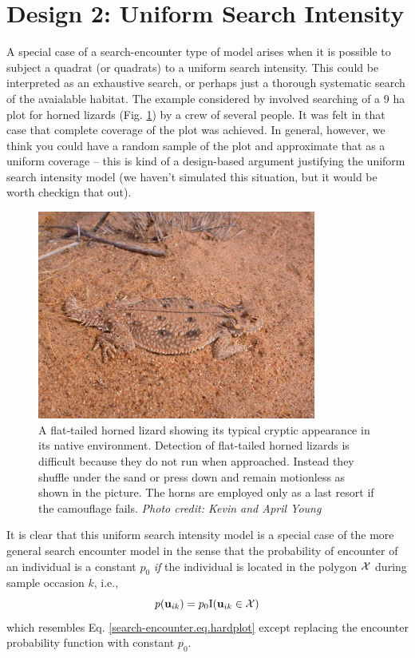 \section{Design 2: Uniform Search Intensity}

A special case of a search-encounter type of model arises when it is
possible to subject a quadrat (or quadrats) to a uniform search
intensity. This could be interpreted as an exhaustive search, or
perhaps just a thorough systematic search of the avaialable habitat.
The example considered by \citet{royle_young:2008} involved searching
of a 9 ha plot for horned lizards (Fig.
\ref{searchencounter.fig.hornylizard}) by a crew of several people. It
was felt in that case that complete coverage of the plot was
achieved. In general, however, we think you could have a random sample
of the plot and approximate that as a uniform coverage -- this is kind
of a design-based argument justifying the uniform search intensity
model (we haven't simulated this situation, but it would be worth
checkign that out).

\begin{figure}
\centering
\includegraphics[width=3.6in,height=2.7in]{Ch15-searchencounter/figs/horny_lizard.jpg}
\caption{A flat-tailed horned lizard showing its typical cryptic
  appearance in its native environment.  Detection of flat-tailed
  horned lizards is difficult because they do not run when
  approached. Instead they shuffle under the sand or press down and
  remain motionless as shown in the picture.  The horns are employed
  only as a last resort if the camouflage fails.  {\it Photo credit:
    Kevin and April Young} }
\label{searchencounter.fig.hornylizard}
\end{figure}

It is clear that this uniform search intensity model is a special case
of the more general search encounter model in the sense that the
probability of encounter of an individual is a constant $p_{0}$ {\it
  if} the individual is located in the polygon ${\cal X}$ during
sample occasion $k$, i.e.,
\[
p({\bf u}_{ik}) = p_{0} \mbox{I}({\bf u}_{ik} \in {\cal X})
\]
which resembles Eq. \ref{search-encounter.eq.hardplot} except
replacing the encounter probability function with constant $p_{0}$.


